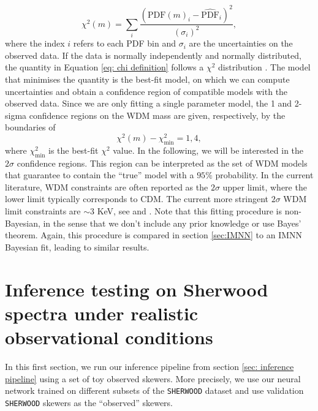 \begin{equation}\label{eq: chi definition}
    \chi^2 (m)=\sum_i \frac{(\text{PDF}(m)_i-\widehat{\text{PDF}}_i)^2}{(\sigma_i)^2},
\end{equation}
where the index $i$ refers to each PDF bin and $\sigma_i$ are the uncertainties on the observed data. If the data is normally independently and normally distributed, the quantity in Equation \ref{eq: chi definition} follows a $\chi^2$ distribution \cite{numerical_recipees_c}. The model that minimises the quantity is the best-fit model, on which we can compute uncertainties and obtain a confidence region of compatible models with the observed data. Since we are only fitting a single parameter model, the 1 and 2-sigma confidence regions on the WDM mass are given, respectively, by the boundaries of 
\begin{equation}\label{eq:sigma chi square}
    \chi^2(m)-\chi^2_{\text{min}}=1,4,
\end{equation}
where $\chi^2_{\text{min}}$ is the best-fit $\chi^2$ value.
In the following, we will be interested in the $2\sigma$ confidence regions. This region can be interpreted as the set of WDM models that guarantee to contain the ``true'' model with a $95\%$ probability. In the current literature, WDM constraints are often reported as the $2\sigma$ upper limit, where the lower limit typically corresponds to CDM. The current more stringent $2\sigma$
WDM limit constraints are $\sim 3$ KeV, see \cite{Villasenor_2023} and \cite{sherwood_wdm}.
Note that this fitting procedure is non-Bayesian, in the sense that we don't include any prior knowledge or use Bayes' theorem. Again, this procedure is compared in section \ref{sec:IMNN} to an IMNN Bayesian fit, leading to similar results. 





\section{Inference testing on Sherwood spectra under realistic observational conditions}\label{sec:inference test sherwood}
In this first section, we run our inference pipeline from section \ref{sec: inference pipeline} using a set of toy observed skewers. More precisely, we use our neural network trained on different subsets of the \texttt{SHERWOOD} dataset and use validation \texttt{SHERWOOD} skewers as the ``observed'' skewers.

